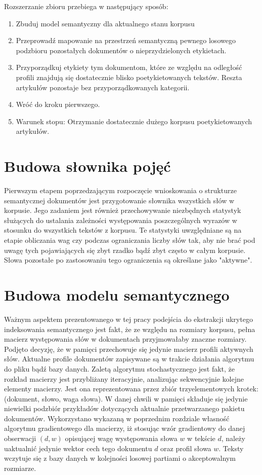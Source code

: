 \documentclass{pracamgr}
\begin{document}
Rozszerzanie zbioru przebiega w następujący sposób:
\begin{enumerate}
    \item Zbuduj model semantyczny dla aktualnego stanu korpusu
    \item Przeprowadź mapowanie na przestrzeń semantyczną pewnego losowego podzbioru pozostałych dokumentów o nieprzydzielonych etykietach.
    \item Przyporządkuj etykiety tym dokumentom, które ze względu na odległość profili znajdują się dostatecznie blisko poetykietowanych tekstów. Reszta artykułów pozostaje bez przyporządkowanych kategorii.
    \item Wróć do kroku pierwszego.
    \item Warunek stopu: Otrzymanie dostatecznie dużego korpusu poetykietowanych artykułów.
\end{enumerate}

\section{Budowa słownika pojęć}
Pierwszym etapem poprzedzającym rozpoczęcie wnioskowania o strukturze semantycznej dokumentów jest przygotowanie słownika wszystkich słów w korpusie. Jego zadaniem jest również przechowywanie niezbędnych statystyk służących do ustalania zależności występowania poszczególnych wyrazów w stosunku do wszystkich tekstów z korpusu. Te statystyki uwzględniane są na etapie obliczania wag czy podczas ograniczania liczby słów tak, aby nie brać pod uwagę tych pojawiających się zbyt rzadko bądź zbyt często w całym korpusie. Słowa pozostałe po zastosowaniu tego ograniczenia są określane jako "aktywne".

\section{Budowa modelu semantycznego}
Ważnym aspektem prezentowanego w tej pracy podejścia do ekstrakcji ukrytego indeksowania semantycznego jest fakt, że ze względu na rozmiary korpusu, pełna macierz występowania słów w dokumentach przyjmowałaby znaczne rozmiary. Podjęto decyzję, że w pamięci przechowuje się jedynie macierz profili aktywnych słów. Aktualne profile dokumentów zapisywane są w trakcie działania algorytmu do pliku bądź bazy danych. Zaletą algorytmu stochastycznego jest fakt, że rozkład macierzy jest przybliżany iteracyjnie, analizując sekwencyjnie kolejne elementy macierzy. Jest ona reprezentowana przez zbiór trzyelementowych krotek: (dokument, słowo, waga słowa). W danej chwili w pamięci składuje się jedynie niewielki podzbiór przykładów dotyczących aktualnie przetwarzanego pakietu dokumentów. Wykorzystano wykazaną w poprzednim rozdziale własność algorytmu gradientowego dla macierzy, iż stosując wzór gradientowy do danej obserwacji $(d, w)$ opisującej wagę występowania słowa $w$ w tekście $d$, należy uaktualnić jedynie wektor cech tego dokumentu $d$ oraz profil słowa $w$. Teksty wczytuje się z bazy danych w kolejności losowej partiami o akceptowalnym rozmiarze.
\end{document}
